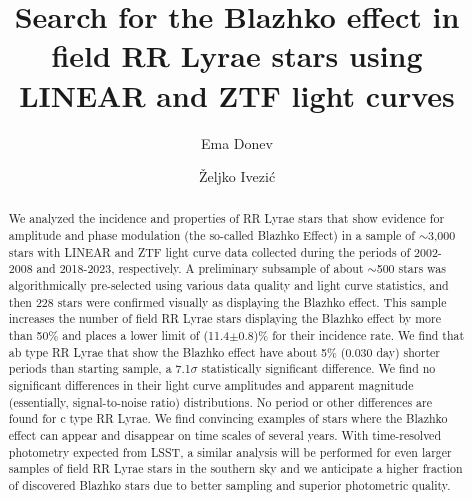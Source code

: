 \documentclass[twocolumn, tighten]{aastex631}
\begin{document}
\title{Search for the Blazhko effect in field RR Lyrae stars using LINEAR and ZTF light curves}

\author{Ema Donev}

\author[0000-0001-5250-2633]{\v{Z}eljko Ivezi\'{c}}



\begin{abstract}
We analyzed the incidence and properties of RR Lyrae stars that show evidence for amplitude and
phase modulation (the so-called Blazhko Effect) in a sample of $\sim$3,000 stars with LINEAR and ZTF light
curve data collected during the periods of 2002-2008 and 2018-2023, respectively. A preliminary subsample
of about $\sim$500 stars was algorithmically pre-selected using various data quality and light curve statistics,
and then 228 stars were confirmed visually as displaying the Blazhko effect. This sample increases the number
of field RR Lyrae stars displaying the Blazhko effect by more than 50\% and places a lower
limit of (11.4$\pm$0.8)\% for their incidence rate. We find that ab type RR Lyrae that show the Blazhko effect have
about 5\% (0.030 day) shorter periods than starting sample, a 7.1$\sigma$ statistically significant
difference. We find no significant differences in their light curve amplitudes and apparent magnitude (essentially,
signal-to-noise ratio) distributions. No period or other differences are found for c type RR Lyrae. We find convincing
examples of stars where the Blazhko effect can appear and disappear on time scales of several years.  With
time-resolved photometry expected from LSST, a similar analysis will be performed for even larger samples of field
RR Lyrae stars in the southern sky and we anticipate a higher fraction of discovered Blazhko stars due to better
sampling and superior photometric quality.
\end{abstract}
 





\end{document}
